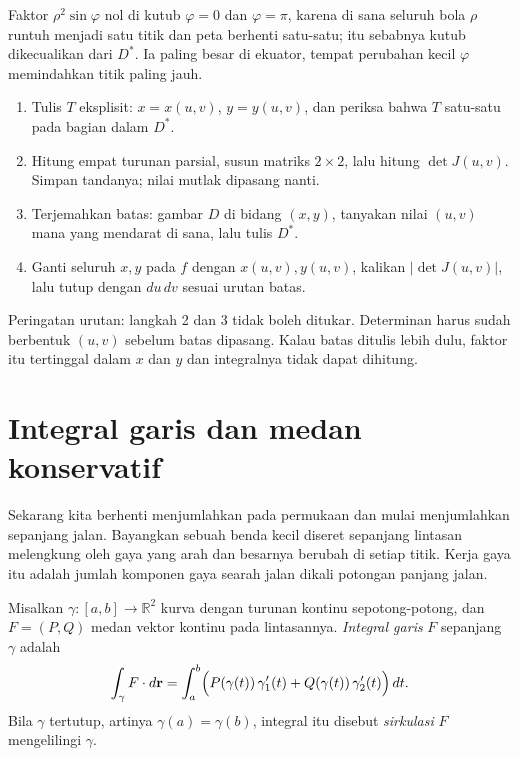 Faktor $\rho^{2}\sin\varphi$ nol di kutub $\varphi=0$ dan $\varphi=\pi$,
karena di sana seluruh bola $\rho$ runtuh menjadi satu titik dan peta berhenti
satu-satu; itu sebabnya kutub dikecualikan dari $D^{*}$. Ia paling besar di
ekuator, tempat perubahan kecil $\varphi$ memindahkan titik paling jauh.

\begin{resep}
\begin{enumerate}
\item Tulis $T$ eksplisit: $x=x(u,v)$, $y=y(u,v)$, dan periksa bahwa $T$
  satu-satu pada bagian dalam $D^{*}$.
\item Hitung empat turunan parsial, susun matriks $2\times2$, lalu hitung
  $\det J(u,v)$. Simpan tandanya; nilai mutlak dipasang nanti.
\item Terjemahkan batas: gambar $D$ di bidang $(x,y)$, tanyakan nilai $(u,v)$
  mana yang mendarat di sana, lalu tulis $D^{*}$.
\item Ganti seluruh $x,y$ pada $f$ dengan $x(u,v),y(u,v)$, kalikan
  $|\det J(u,v)|$, lalu tutup dengan $du\,dv$ sesuai urutan batas.
\end{enumerate}
Peringatan urutan: langkah 2 dan 3 tidak boleh ditukar. Determinan harus sudah
berbentuk $(u,v)$ sebelum batas dipasang. Kalau batas ditulis lebih dulu, faktor itu tertinggal dalam $x$ dan $y$ dan
integralnya tidak dapat dihitung.
\end{resep}




\section{Integral garis dan medan konservatif}

Sekarang kita berhenti menjumlahkan pada permukaan dan mulai menjumlahkan
sepanjang jalan. Bayangkan sebuah benda kecil diseret sepanjang lintasan
melengkung oleh gaya yang arah dan besarnya berubah di setiap titik. Kerja
gaya itu adalah jumlah komponen gaya searah jalan dikali potongan panjang
jalan.

\begin{definisi}
Misalkan $\gamma\colon[a,b]\to\mathbb{R}^{2}$ kurva dengan turunan kontinu
sepotong-potong, dan $F=(P,Q)$ medan vektor kontinu pada lintasannya.
\emph{Integral garis} $F$ sepanjang $\gamma$ adalah
\[
\int_{\gamma}F\cdot d\mathbf{r}
=\int_{a}^{b}\Bigl(P(\gamma(t))\,\gamma_{1}'(t)
+Q(\gamma(t))\,\gamma_{2}'(t)\Bigr)\,dt .
\]
Bila $\gamma$ tertutup, artinya $\gamma(a)=\gamma(b)$, integral itu disebut
\emph{sirkulasi} $F$ mengelilingi $\gamma$.
\end{definisi}

